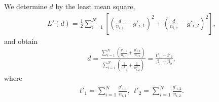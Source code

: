 \documentclass{article}
\begin{document}
We determine $d$ by the least mean square, 
\begin{align}
 L'(d) = \frac{1}{2} \sum_{i=1}^N \left[ \left(\frac{d}{n_{i,1}} - g'_{i,1}\right)^2 + \left(\frac{d}{n_{i,2}} - g'_{i,2}\right)^2\right], 
\end{align}
and obtain 
\begin{align}
 d = \frac{\sum_{i=1}^N \left(\frac{g'_{i,1}}{n_{i,1}} + \frac{g'_{i,2}}{n_{i,2}}\right)}{\sum_{i=1}^N \left(\frac{1}{n_{i,1}^2} + \frac{1}{n_{i,2}^2}\right)} = \frac{t'_1 + t'_2}{\beta_1 + \beta_2}, 
\end{align}
where 
\begin{align}
 t'_1 = \sum_{i=1}^N \frac{g'_{i,1}}{n_{i,1}}, \ \ 
 t'_2 = \sum_{i=1}^N \frac{g'_{i,2}}{n_{i,2}}. 
\end{align}

\begin{comment}

\end{comment}
\end{document}
